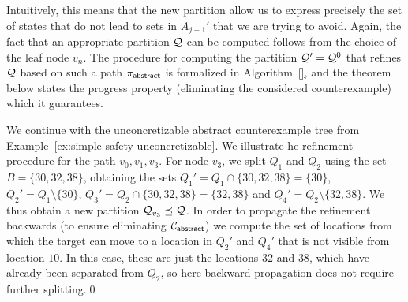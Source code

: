 Intuitively, this means that the new partition allow us to express precisely the set of states that do not lead to sets in $A_{j+1}'$ that we are trying to avoid. Again, the fact that an appropriate partition $\mathcal{Q}$ can be computed follows from the choice of the leaf node $v_n$. The procedure for computing the partition $\mathcal{Q}' = \mathcal{Q}^0$ that refines $\mathcal{Q}$ based on such a path $\pi_{\mathsf{abstract}}$ is formalized in Algorithm~\ref{}, and the theorem below states the progress property (eliminating the considered counterexample) which it guarantees.

\begin{example}
We continue with the unconcretizable abstract counterexample tree from Example~\ref{ex:simple-safety-unconcretizable}. We illustrate he refinement procedure for the path $v_0,v_1,v_3$. For node $v_3$, we split $Q_1$ and $Q_2$ using the set $B = \{30,32,38\}$, obtaining the sets $Q_1' = Q_1 \cap \{30,32,38\} = \{30\}$, $Q_2' = Q_1\setminus\{30\}$, $Q_3' = Q_2 \cap \{30,32,38\} = \{32,38\}$ and $Q_4' = Q_2 \setminus \{32,38\}$. We thus obtain a new partition $\mathcal{Q}_{v_3} \preceq \mathcal{Q}$. In order to propagate the refinement backwards (to ensure eliminating $\mathcal{C}_{\mathsf{abstract}}$) we compute the set of locations from which the target can move to a location in $Q_2'$ and $Q_4'$ that is not visible from location $10$. In this case, these are just the locations $32$ and $38$, which have already been separated from $Q_2$, so here backward propagation does not require further splitting.\qed
\end{example}


